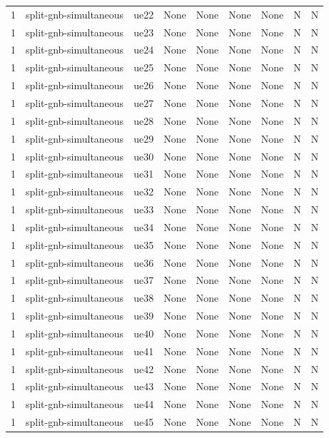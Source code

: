 \begin{table}[ht]
\begin{tabular}{|c|c|c|c|c|c|c|c|c|}
1 & split-gnb-simultaneous & ue22 & None & None & None & None & N & N \\
1 & split-gnb-simultaneous & ue23 & None & None & None & None & N & N \\
1 & split-gnb-simultaneous & ue24 & None & None & None & None & N & N \\
1 & split-gnb-simultaneous & ue25 & None & None & None & None & N & N \\
1 & split-gnb-simultaneous & ue26 & None & None & None & None & N & N \\
1 & split-gnb-simultaneous & ue27 & None & None & None & None & N & N \\
1 & split-gnb-simultaneous & ue28 & None & None & None & None & N & N \\
1 & split-gnb-simultaneous & ue29 & None & None & None & None & N & N \\
1 & split-gnb-simultaneous & ue30 & None & None & None & None & N & N \\
1 & split-gnb-simultaneous & ue31 & None & None & None & None & N & N \\
1 & split-gnb-simultaneous & ue32 & None & None & None & None & N & N \\
1 & split-gnb-simultaneous & ue33 & None & None & None & None & N & N \\
1 & split-gnb-simultaneous & ue34 & None & None & None & None & N & N \\
1 & split-gnb-simultaneous & ue35 & None & None & None & None & N & N \\
1 & split-gnb-simultaneous & ue36 & None & None & None & None & N & N \\
1 & split-gnb-simultaneous & ue37 & None & None & None & None & N & N \\
1 & split-gnb-simultaneous & ue38 & None & None & None & None & N & N \\
1 & split-gnb-simultaneous & ue39 & None & None & None & None & N & N \\
1 & split-gnb-simultaneous & ue40 & None & None & None & None & N & N \\
1 & split-gnb-simultaneous & ue41 & None & None & None & None & N & N \\
1 & split-gnb-simultaneous & ue42 & None & None & None & None & N & N \\
1 & split-gnb-simultaneous & ue43 & None & None & None & None & N & N \\
1 & split-gnb-simultaneous & ue44 & None & None & None & None & N & N \\
1 & split-gnb-simultaneous & ue45 & None & None & None & None & N & N \\

\end{tabular}
\end{table}
